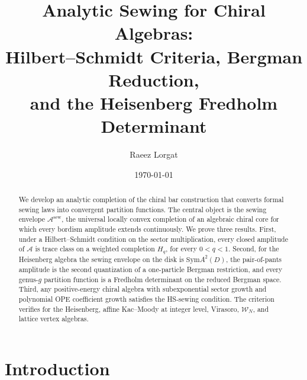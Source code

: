 \documentclass[11pt,reqno]{amsart}
\theoremstyle{definition}
\theoremstyle{remark}
\newcommand{\cA}{\mathcal{A}}
\newcommand{\Sym}{\mathrm{Sym}}
\numberwithin{equation}{section}
\begin{document}
\title[Analytic Sewing for Chiral Algebras]
{Analytic Sewing for Chiral Algebras:\\
Hilbert--Schmidt Criteria, Bergman Reduction,\\
and the Heisenberg Fredholm Determinant}

\author{Raeez Lorgat}
\address{Department of Mathematics, Harvard University,
 Cambridge, MA 02138, USA}

\date{\today}

\begin{abstract}
We develop an analytic completion of the chiral bar construction
that converts formal sewing laws into convergent partition
functions. The central object is the sewing envelope
$\cA^{\mathrm{sew}}$, the universal locally convex completion of
an algebraic chiral core for which every bordism amplitude extends
continuously. We prove three results. First, under a
Hilbert--Schmidt condition on the sector multiplication, every
closed amplitude of $\cA$ is trace class on a weighted completion
$H_q$, for every $0 < q < 1$. Second, for the Heisenberg algebra
the sewing envelope on the disk is $\Sym A^2(D)$, the pair-of-pants
amplitude is the second quantization of a one-particle Bergman
restriction, and every genus-$g$ partition function is a Fredholm
determinant on the reduced Bergman space. Third, any
positive-energy chiral algebra with subexponential sector growth
and polynomial OPE coefficient growth satisfies the HS-sewing
condition. The criterion verifies for the Heisenberg, affine
Kac--Moody at integer level, Virasoro, $\mathcal{W}_N$, and
lattice vertex algebras.
\end{abstract}



\maketitle


\section{Introduction}\label{sec:intro}
\end{document}
